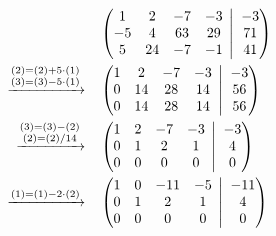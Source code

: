 \documentclass[a4paper,12pt]{article}
\newcommand{\BigMiddleThree}{\;\left|\vphantom{\begin{pmatrix} 0\\0\\0 \end{pmatrix}}\right.\;}
\begin{document}
\begin{solution}
    \begin{equation*}
    \begin{split}
      &\left(
          \begin{matrix}
            1 & 2 & -7 & -3\\
            -5 & 4 & 63 & 29\\
            5 & 24 & -7 & -1
          \end{matrix}
          \BigMiddleThree
          \begin{matrix}
            -3\\
            71\\
            41
          \end{matrix}
        \right)\\
      \xrightarrow{\substack{(2) = (2) + 5 \cdot (1)\\(3) = (3) - 5 \cdot (1)}}\quad &\left(
          \begin{matrix}
            1 & 2 & -7 & -3\\
            0 & 14 & 28 & 14\\
            0 & 14 & 28 & 14
          \end{matrix}
          \BigMiddleThree
          \begin{matrix}
            -3\\
            56\\
            56
          \end{matrix}
        \right)\\
      \xrightarrow{\substack{(3) = (3) - (2)\\(2) = (2) / 14}}\quad &\left(
          \begin{matrix}
            1 & 2 & -7 & -3\\
            0 & 1 & 2 & 1\\
            0 & 0 & 0 & 0
          \end{matrix}
          \BigMiddleThree
          \begin{matrix}
            -3\\
            4\\
            0
          \end{matrix}
        \right)\\
      \xrightarrow{(1) = (1) - 2 \cdot (2)}\quad &\left(
          \begin{matrix}
            1 & 0 & -11 & -5\\
            0 & 1 & 2 & 1\\
            0 & 0 & 0 & 0
          \end{matrix}
          \BigMiddleThree
          \begin{matrix}
            -11\\
            4\\
            0
          \end{matrix}
        \right)
    \end{split}
    \end{equation*}
    

\end{solution}
\end{document}
